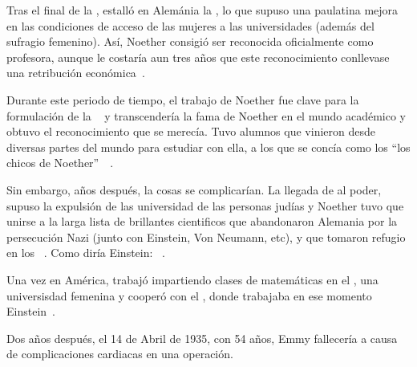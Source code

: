 Tras el final de la , estalló en Alemánia la , lo que supuso una paulatina mejora en las condiciones de acceso de las mujeres a las universidades (además del sufragio femenino).
Así, Noether consigió ser reconocida oficialmente como profesora, aunque le costaría aun tres años que este reconocimiento conllevase una retribución económica~\autocite[333]{Carrasco}.

Durante este periodo de tiempo, el trabajo de Noether fue clave para la formulación de la ~\autocite{Weyl} y transcendería la fama de Noether en el mundo académico y obtuvo el reconocimiento que se merecía.
Tuvo alumnos que vinieron desde diversas partes del mundo para estudiar con ella, a los que se concía como los \textquotedblleft los chicos de Noether\textquotedblright\ ~\autocite{Carrasco}.

Sin embargo, años después, la cosas se complicarían.
La llegada de  al poder, supuso la expulsión de las universidad de las personas judías y Noether tuvo que unirse a la larga lista de brillantes cientificos que abandonaron Alemania por la persecución Nazi (junto con Einstein, Von Neumann, etc), y que tomaron refugio en los ~\autocite{Kimberling}.
Como diría Einstein: ~\autocite{Einstein}.

Una vez en América, trabajó impartiendo clases de matemáticas en el , una universisdad femenina y cooperó con el , donde trabajaba en ese momento Einstein~\autocite{Carrasco}.

Dos años después, el 14 de Abril de 1935, con 54 años, Emmy fallecería a causa de complicaciones cardiacas en una operación.